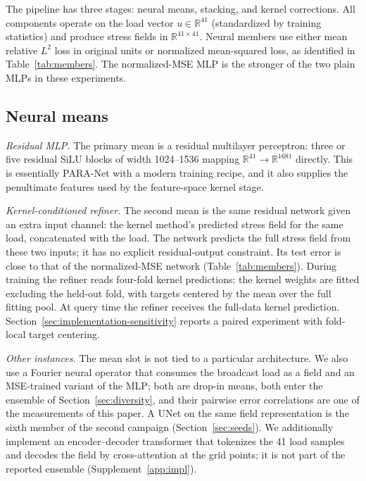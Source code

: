 The pipeline has three stages: neural means, stacking, and kernel
corrections. All components operate on the load vector $u\in\mathbb R^{41}$
(standardized by training statistics) and produce stress fields in
$\mathbb R^{41\times41}$. Neural members use either mean relative $L^2$ loss in original units or normalized mean-squared loss, as identified in Table~\ref{tab:members}. The normalized-MSE MLP is the stronger of the two plain MLPs in these experiments.

\subsection{Neural means}
\emph{Residual MLP.} The primary mean is a residual multilayer perceptron:
three or five residual SiLU blocks of width 1024--1536 mapping
$\mathbb R^{41}\to\mathbb R^{1681}$ directly. This is essentially PARA-Net
\citep{dehoop2022cost} with a modern training recipe, and it also supplies the
penultimate features used by the feature-space kernel stage.

\emph{Kernel-conditioned refiner.} The second mean is the same residual network
given an extra input channel: the kernel method's predicted stress field for
the same load, concatenated with the load. The network predicts the full stress
field from these two inputs; it has no explicit residual-output constraint.
Its test error is close to that of the normalized-MSE network
(Table~\ref{tab:members}). During training the refiner reads four-fold kernel predictions: the kernel weights are fitted excluding the held-out fold, with targets centered by the mean over the full fitting pool. At query time the refiner receives the full-data kernel prediction. Section~\ref{sec:implementation-sensitivity} reports a paired experiment with fold-local target centering.

\emph{Other instances.} The mean slot is not tied to a particular
architecture. We also use a Fourier neural operator \citep{li2021fourier}
that consumes the broadcast load as a field and an MSE-trained variant of the
MLP; both are drop-in means, both enter the ensemble of
Section~\ref{sec:diversity}, and their pairwise error correlations are one of
the measurements of this paper. A UNet on the same field representation is
the sixth member of the second campaign (Section~\ref{sec:seeds}). We
additionally implement an encoder--decoder
transformer \citep{vaswani2017attention,dosovitskiy2021image} that tokenizes
the 41 load samples and decodes the field by cross-attention at the grid
points; it is not part of the reported ensemble (Supplement~\ref{app:impl}).

